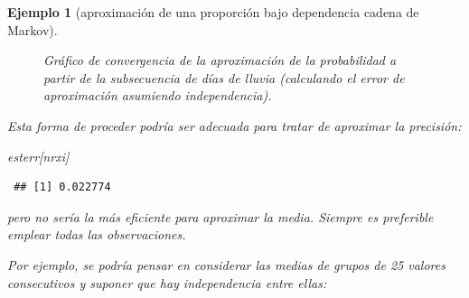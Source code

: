 \documentclass[
  10pt,
]{book}
\newenvironment{Shaded}{\begin{snugshade}}{\end{snugshade}}
\newcommand{\NormalTok}[1]{#1}
\theoremstyle{break}
\newtheorem{example}{Ejemplo}[chapter]
\theoremstyle{nonumberplain}
\begin{document}
\begin{example}[aproximación de una proporción bajo dependencia cadena de Markov]
\begin{figure}[!htbp]
\caption{Gráfico de convergencia de la aproximación de la probabilidad a partir de la subsecuencia de días de lluvia (calculando el error de aproximación asumiendo independencia).}\label{fig:conv-dep2}
\end{figure}

Esta forma de proceder podría ser adecuada para tratar de aproximar la precisión:

\begin{Shaded}
\begin{Highlighting}[]
\NormalTok{esterr[nrxi]}
\end{Highlighting}
\end{Shaded}

\begin{verbatim}
 ## [1] 0.022774
\end{verbatim}

pero no sería la más eficiente para aproximar la media. Siempre es preferible emplear todas las observaciones.

Por ejemplo, se podría pensar en considerar las medias de grupos de 25 valores consecutivos y suponer que hay independencia entre ellas:


\end{example}
\end{document}
